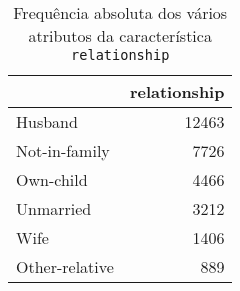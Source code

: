 \begin{table}
\centering
\caption{Frequência absoluta dos vários atributos da característica \texttt{relationship}}
\begin{tabular}{lr}
\toprule
{} &  relationship \\
\midrule
 Husband        &         12463 \\
 Not-in-family  &          7726 \\
 Own-child      &          4466 \\
 Unmarried      &          3212 \\
 Wife           &          1406 \\
 Other-relative &           889 \\
\bottomrule
\end{tabular}
\end{table}
